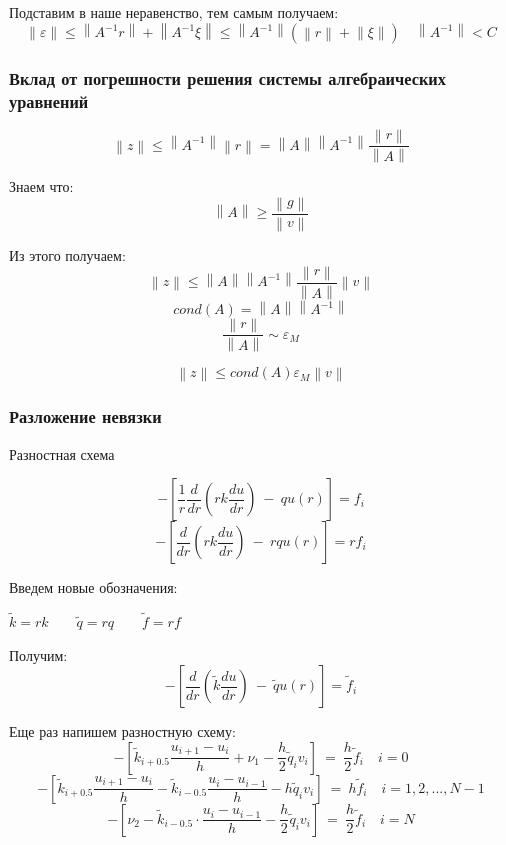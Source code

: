 Подставим в наше неравенство, тем самым получаем:
\[
  \left\lVert \varepsilon \right\rVert \leq \left\lVert A^{-1}r \right\rVert + \left\lVert A^{-1}\xi \right\rVert
  \leq \left\lVert A^{-1} \right\rVert ( \left\lVert r \right\rVert  + \left\lVert \xi \right\rVert)
  \quad \left\lVert A^{-1}\right\rVert  < C
\]

\subsubsection{Вклад от погрешности решения системы алгебраических уравнений}
\[
  \left\lVert z \right\rVert \leq \left\lVert A^{-1} \right\rVert \left\lVert r \right\rVert =
  \left\lVert A \right\rVert \left\lVert A^{-1} \right\rVert \frac{\left\lVert r \right\rVert }{\left\lVert A \right\rVert } 
\]

Знаем что:
\[
  \left\lVert A \right\rVert \geq \frac{\left\lVert g \right\rVert }{\left\lVert v\right\rVert }
\]

Из этого получаем:
\[
  \left\lVert z \right\rVert \leq \left\lVert A \right\rVert \left\lVert A^{-1} \right\rVert
  \frac{\left\lVert r \right\rVert }{\left\lVert A \right\rVert } \left\lVert v \right\rVert 
\]
\[
  cond(A) = \left\lVert A \right\rVert \left\lVert A^{-1} \right\rVert
\]
\[
  \frac{\left\lVert r \right\rVert }{\left\lVert A \right\rVert } \sim \varepsilon_{M}
\]


\[
  \left\lVert z \right\rVert \leq cond(A) \varepsilon_{M} \left\lVert v \right\rVert 
\]

\subsubsection{Разложение невязки}

Разностная схема

\[
  -\left[ \frac{1}{r} \frac{d}{dr} \left(rk\frac{du}{dr} \right)\ -\ qu(r) \right] = f_i
\]
\[
  -\left[ \frac{d}{dr} \left(rk\frac{du}{dr} \right)\ -\ rqu(r) \right] = rf_i
\]

Введем новые обозначения:
\begin{center}
  $ \tilde{k} = rk \qquad \tilde{q} = rq \qquad \tilde{f} = rf $
\end{center}

Получим:
\[
  -\left[ \frac{d}{dr} \left(\tilde{k}\frac{du}{dr} \right)\ -\ \tilde{q}u(r) \right] = \tilde{f}_i
\]

Еще раз напишем разностную схему:
\[
  -\left[ \tilde{k}_{i+0.5}\frac{u_{i+1}-u_i}{h} + \nu_1 - \frac{h}{2} \tilde{q}_i v_i \right]\ =\ \frac{h}{2} \tilde{f}_i \quad i = 0
\]
\[
-\left[ \tilde{k}_{i+0.5}\frac{u_{i+1}-u_i}{h} - \tilde{k}_{i-0.5}\frac{u_{i} - u_{i-1}}{h} - h \tilde{q}_i v_i\right]\ =\ h \tilde{f}_i \quad i = 1, 2, ..., N -1
\]
\[
-\left[ \nu_2 - \tilde{k}_{i-0.5} \cdot \frac{u_i-u_{i-1}}{h}- \frac{h}{2} \tilde{q}_i v_i \right]\ =\ \frac{h}{2} \tilde{f}_i \quad i = N
\]

